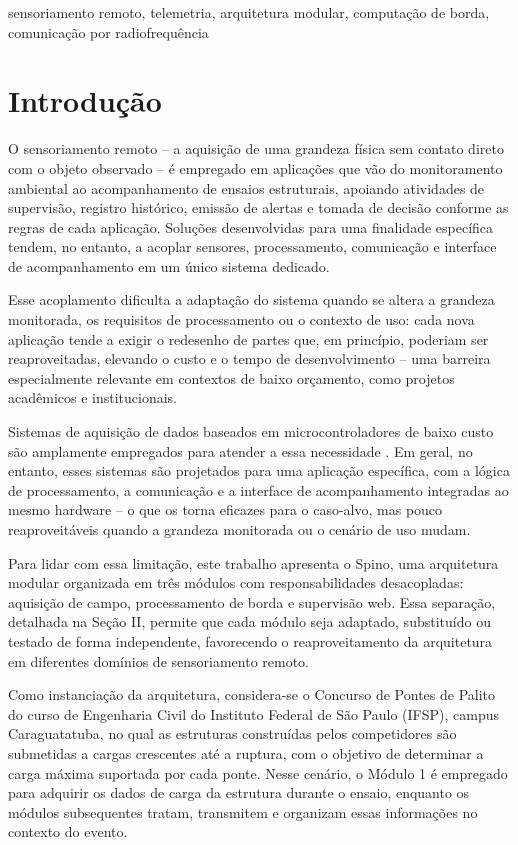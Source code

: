 \documentclass[conference]{IEEEtran}
\begin{document}
\begin{IEEEkeywords}
sensoriamento remoto, telemetria, arquitetura modular, computação de borda, comunicação por radiofrequência
\end{IEEEkeywords}

\section{Introdução}
O sensoriamento remoto -- a aquisição de uma grandeza física sem contato direto com o objeto observado \cite{quartaroli2014} -- é empregado em aplicações que vão do monitoramento ambiental ao acompanhamento de ensaios estruturais, apoiando atividades de supervisão, registro histórico, emissão de alertas e tomada de decisão conforme as regras de cada aplicação. Soluções desenvolvidas para uma finalidade específica tendem, no entanto, a acoplar sensores, processamento, comunicação e interface de acompanhamento em um único sistema dedicado.

Esse acoplamento dificulta a adaptação do sistema quando se altera a grandeza monitorada, os requisitos de processamento ou o contexto de uso: cada nova aplicação tende a exigir o redesenho de partes que, em princípio, poderiam ser reaproveitadas, elevando o custo e o tempo de desenvolvimento -- uma barreira especialmente relevante em contextos de baixo orçamento, como projetos acadêmicos e institucionais.

Sistemas de aquisição de dados baseados em microcontroladores de baixo custo são amplamente empregados para atender a essa necessidade \cite{vidalpardo2018,njoku2025,elabd2017}. Em geral, no entanto, esses sistemas são projetados para uma aplicação específica, com a lógica de processamento, a comunicação e a interface de acompanhamento integradas ao mesmo hardware -- o que os torna eficazes para o caso-alvo, mas pouco reaproveitáveis quando a grandeza monitorada ou o cenário de uso mudam.

Para lidar com essa limitação, este trabalho apresenta o Spino, uma arquitetura modular organizada em três módulos com responsabilidades desacopladas: aquisição de campo, processamento de borda e supervisão web. Essa separação, detalhada na Seção II, permite que cada módulo seja adaptado, substituído ou testado de forma independente, favorecendo o reaproveitamento da arquitetura em diferentes domínios de sensoriamento remoto.

Como instanciação da arquitetura, considera-se o Concurso de Pontes de Palito do curso de Engenharia Civil do Instituto Federal de São Paulo (IFSP), campus Caraguatatuba, no qual as estruturas construídas pelos competidores são submetidas a cargas crescentes até a ruptura, com o objetivo de determinar a carga máxima suportada por cada ponte. Nesse cenário, o Módulo 1 é empregado para adquirir os dados de carga da estrutura durante o ensaio, enquanto os módulos subsequentes tratam, transmitem e organizam essas informações no contexto do evento.
\end{document}
